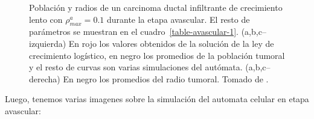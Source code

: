 \begin{figure}[p]
\begin{center}
        \end{center}\vspace*{-0.6cm}
        \caption[Poblaci\'on y radios de un carcinoma ductal infiltrante de crecimiento lento con $\rho_{max}^a=0$.$1$ durante la etapa avascular]{Poblaci\'on y radios de un carcinoma ductal infiltrante de crecimiento lento con $\rho_{max}^a=0$.$1$ durante la etapa avascular. El resto de par\'ametros se muestran en el cuadro~\ref{table-avascular-1}. (a,b,c--izquierda) En rojo los valores obtenidos de la soluci\'on de la ley de crecimiento log\'istico, en negro los promedios de la poblaci\'on tumoral y el resto de curvas son varias simulaciones del aut\'omata. (a,b,c--derecha) En negro los promedios del radio tumoral. Tomado de \cite{viabarre2019}.}
        \label{graph-avascular-simulations-1}
        \end{figure}

    Luego, tenemos varias imagenes sobre la simulación del automata celular en etapa avascular:


